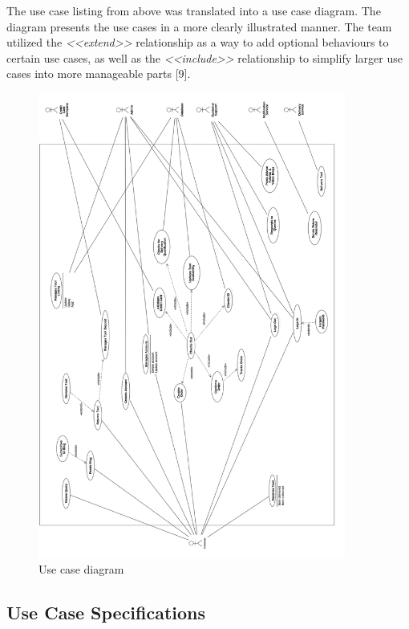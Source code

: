 The use case listing from above was translated into a use case diagram.
The diagram presents the use cases in a more clearly illustrated manner.
The team utilized the \textit{<<extend>>} relationship as a way to add
optional behaviours to certain use cases, as well as the
\textit{<<include>>} relationship to simplify larger use cases into more
manageable parts {[}9{]}.

\begin{figure}[H]
      \centering
      \includegraphics[trim = 0 0 0 0, clip, width=0.9\textwidth]{TempImg/UCDiagram.png}
      \caption{Use case diagram}
 \end{figure}

\hypertarget{use-case-specifications}{%
\subsection{Use Case Specifications}\label{use-case-specifications}}

